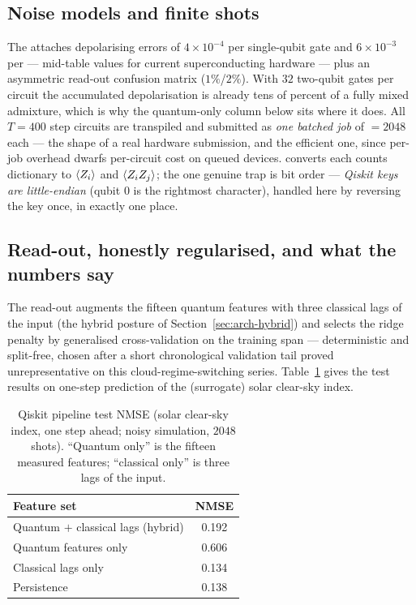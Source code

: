 \subsection{Noise models and finite shots}

The  attaches depolarising errors of $4\times10^{-4}$ per
single-qubit gate and $6\times10^{-3}$ per  --- mid-table values for
current superconducting hardware --- plus an asymmetric read-out confusion
matrix ($1\%$/$2\%$). With $32$ two-qubit gates per circuit the accumulated
depolarisation is already tens of percent of a fully mixed admixture, which
is why the quantum-only column below sits where it does. All $T=400$ step
circuits are transpiled and submitted as \emph{one batched job} of
$=2048$ each --- the shape of a real hardware submission, and the
efficient one, since per-job overhead dwarfs per-circuit cost on queued
devices.  converts each counts dictionary to
$\langle Z_i\rangle$ and $\langle Z_iZ_j\rangle$; the one genuine trap is bit order ---
\emph{Qiskit keys are little-endian} (qubit $0$ is the rightmost character),
handled here by reversing the key once, in exactly one place.

\subsection{Read-out, honestly regularised, and what the numbers say}
\label{sec:qiskit-results}

The read-out augments the fifteen quantum features with three classical lags
of the input (the hybrid posture of Section~\ref{sec:arch-hybrid}) and
selects the ridge penalty by generalised cross-validation on the training
span --- deterministic and split-free, chosen after a short chronological
validation tail proved unrepresentative on this cloud-regime-switching
series. Table~\ref{tab:qiskit-results} gives the test results on one-step
prediction of the (surrogate) solar clear-sky index.

\begin{table}[h]
\centering\small
\caption{Qiskit pipeline test NMSE (solar clear-sky index, one step ahead;
noisy simulation, $2048$ shots). ``Quantum only'' is the fifteen measured
features; ``classical only'' is three lags of the input.}
\label{tab:qiskit-results}
\begin{tabular}{@{}lc@{}}
\toprule
Feature set & NMSE \\
\midrule
Quantum $+$ classical lags (hybrid) & 0.192 \\
Quantum features only & 0.606 \\
Classical lags only & 0.134 \\
Persistence & 0.138 \\
\bottomrule
\end{tabular}
\end{table}

